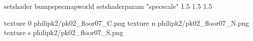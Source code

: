 setshader bumpspecmapworld
setshaderparam "specscale" 1.5 1.5 1.5

texture 0 philipk2/pk02_floor07_C.png
texture n philipk2/pk02_floor07_N.png
texture s philipk2/pk02_floor07_S.png

